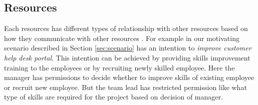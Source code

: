 \subsection{Resources} 
\label{sec:resources}
Each resources has different types of relationship with other resources based on how they communicate with other resources \cite{Sungur2015}. For example in our motivating scenario described in Section \ref{sec:scenario} has an intention to \textit{improve customer help desk portal}. This intention can be achieved by providing skills improvement training to the employees or by recruiting newly skilled employee. Here the manager has permissions to decide whether to improve skills of existing employee or recruit new employee. But the team lead has restricted permission like what type of skills are required for the project based on decision of manager. 
